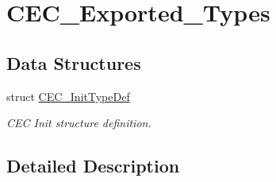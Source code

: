 \hypertarget{group___c_e_c___exported___types}{}\section{C\+E\+C\+\_\+\+Exported\+\_\+\+Types}
\label{group___c_e_c___exported___types}
\subsection*{Data Structures}
\begin{DoxyCompactItemize}
\item 
struct \mbox{\hyperlink{struct_c_e_c___init_type_def}{C\+E\+C\+\_\+\+Init\+Type\+Def}}
\begin{DoxyCompactList}\small\item\em C\+EC Init structure definition. \end{DoxyCompactList}\end{DoxyCompactItemize}


\subsection{Detailed Description}
